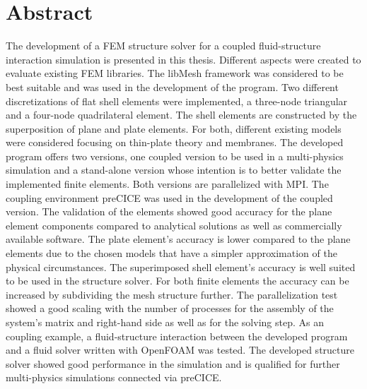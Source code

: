 \section*{Abstract}

The development of a FEM structure solver for a coupled fluid-structure interaction simulation is presented in this thesis. Different aspects were created to evaluate existing FEM libraries. The libMesh framework was considered to be best suitable and was used in the development of the program. Two different discretizations of flat shell elements were implemented, a three-node triangular and a four-node quadrilateral element. The shell elements are constructed by the superposition of plane and plate elements. For both, different existing models were considered focusing on thin-plate theory and membranes. The developed program offers two versions, one coupled version to be used in a multi-physics simulation and a stand-alone version whose intention is to better validate the implemented finite elements. Both versions are parallelized with MPI. The coupling environment preCICE was used in the development of the coupled version. The validation of the elements showed good accuracy for the plane element components compared to analytical solutions as well as commercially available software. The plate element's accuracy is lower compared to the plane elements due to the chosen models that have a simpler approximation of the physical circumstances. The superimposed shell element's accuracy is well suited to be used in the structure solver. For both finite elements the accuracy can be increased by subdividing the mesh structure further. The parallelization test showed a good scaling with the number of processes for the assembly of the system's matrix and right-hand side as well as for the solving step. As an coupling example, a fluid-structure interaction between the developed program and a fluid solver written with OpenFOAM was tested. The developed structure solver showed good performance in the simulation and is qualified for further multi-physics simulations connected via preCICE.
\newpage